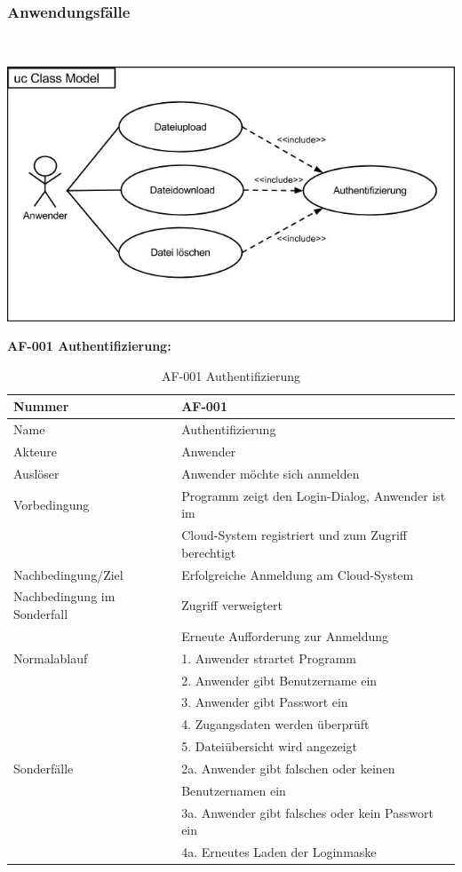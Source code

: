 \documentclass[12pt,a4paper,bibliography=totocnumbered,listof=totocnumbered]{scrartcl}
\begin{document}
\subsubsection{Anwendungsfälle}
\vspace{1em}
$\;$\\
\begin{minipage}{\linewidth}
	\centering
	\includegraphics[width=0.7\linewidth]{UseCase.jpg}
\end{minipage}
\vspace{1em}

\textbf{AF-001 Authentifizierung:}
\begin{table}[!h]
	\centering
	\begin{tabular}{|l|l|}
		\hline
		Nummer & AF-001\\
		\hline
		Name & Authentifizierung\\
		\hline
		Akteure & Anwender\\
		\hline
		Auslöser & Anwender möchte sich anmelden\\
		\hline
		Vorbedingung & Programm zeigt den Login-Dialog, Anwender ist im \\ &  Cloud-System registriert und zum Zugriff berechtigt\\
		\hline
		Nachbedingung/Ziel & Erfolgreiche Anmeldung am Cloud-System \\
		\hline
		Nachbedingung im Sonderfall & Zugriff verweigtert\\ & Erneute Aufforderung zur Anmeldung\\
		\hline
		Normalablauf & 1. Anwender strartet Programm \\ & 2. Anwender gibt Benutzername ein \\ & 3. Anwender gibt Passwort ein \\ & 4. Zugangsdaten werden überprüft \\ & 5. 				Dateiübersicht wird angezeigt \\
		\hline
		Sonderfälle & 2a. Anwender gibt falschen oder keinen \\ & Benutzernamen ein \\ & 3a. Anwender gibt falsches oder kein Passwort ein \\ & 4a. Erneutes Laden der Loginmaske\\
		\hline
	\end{tabular}
	\caption{AF-001 Authentifizierung}
	\label{tab:AF-001 Authentifizierung}
\end{table}
\pagebreak
\end{document}
